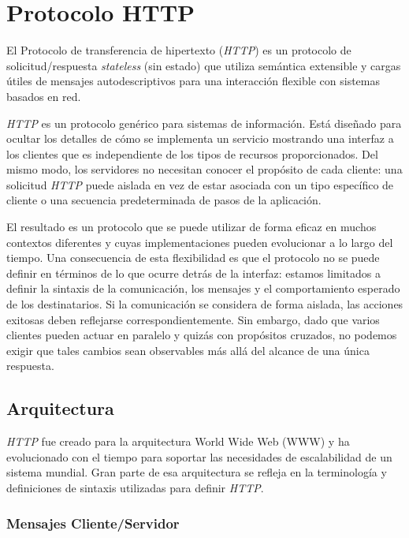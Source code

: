 \section{Protocolo HTTP}

El Protocolo de transferencia de hipertexto (\emph{HTTP}) es un protocolo de 
solicitud/respuesta \emph{stateless} (sin estado) que utiliza semántica 
extensible y cargas útiles de mensajes autodescriptivos para una 
interacción flexible con sistemas basados en red.

   \emph{HTTP} es un protocolo genérico para sistemas de información. Está 
   diseñado para ocultar los detalles de cómo se implementa un servicio 
   mostrando una interfaz a los clientes que es independiente de los 
   tipos de recursos proporcionados. Del mismo modo, los servidores 
   no necesitan conocer el propósito de cada cliente: una solicitud 
   \emph{HTTP} puede aislada en vez de estar asociada con un tipo específico
    de cliente o una secuencia predeterminada de pasos de la aplicación.
     
    El resultado es un protocolo que se puede utilizar de forma eficaz 
     en muchos contextos diferentes y cuyas implementaciones pueden
      evolucionar a lo largo del tiempo.
   Una consecuencia de esta flexibilidad es que el protocolo no 
   se puede definir en términos de lo que ocurre detrás de la 
   interfaz: estamos limitados a definir la sintaxis de la comunicación, 
   los mensajes y el comportamiento esperado de los destinatarios. 
   Si la comunicación se considera de forma aislada, las acciones 
   exitosas deben reflejarse correspondientemente. Sin embargo, 
   dado que varios clientes pueden actuar en paralelo y quizás con
    propósitos cruzados, no podemos exigir que tales cambios sean 
    observables más allá del alcance de una única respuesta.
   
\subsection{Arquitectura}
\emph{HTTP} fue creado para la arquitectura World Wide Web (WWW) y ha 
evolucionado con el tiempo para soportar las necesidades de
 escalabilidad de un sistema mundial. Gran parte de esa arquitectura 
 se refleja en la terminología y  definiciones de sintaxis utilizadas 
 para definir \emph{HTTP}.

\subsubsection*{Mensajes Cliente/Servidor}


